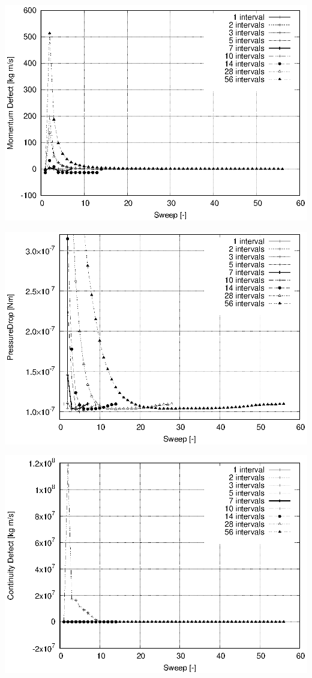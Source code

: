 \documentclass[twoside,a4paper,12pt,bibliography=totoc, parskip=half,english]{scrreprt}
\begin{document}
\includegraphics[scale=1]{13_primal_zero-init_partial.eps}

\includegraphics[scale=1]{12_primal_zero-init_partial.eps}

\includegraphics[scale=1]{14_primal_zero-init_partial.eps}
\end{document}
